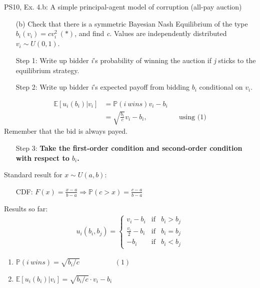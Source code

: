 \begin{frame}{PS10, Ex. 4.b: A simple principal-agent model of corruption (all-pay auction)}
    \begin{itemize}
      \item[(b)] Check that there is a symmetric Bayesian Nash Equilibrium of the type $b_i(v_i) = cv_i^2\ (*)$, and find \textit{c}. Values are independently distributed $v_i\sim U(0, 1)$.
    \end{itemize} \vspace{-8pt}
    \begin{multicols}{2}
      \begin{itemize}
        \item[Step 1:] Write up bidder \textit{i}'s probability of winning the auction if \textit{j} sticks to the equilibrium strategy.
        \item[Step 2:] Write up bidder \textit{i}'s expected payoff from bidding $b_i$ conditional on $v_i$.
      \end{itemize} \vspace{-8pt}
      \begin{align*}
        \mathbb{E}[u_i(b_i)|v_i]&=\mathbb{P}(i\ wins)v_i-b_i\\
                           &=\sqrt{\frac{b_i}{c}}v_i-b_i,&&\text{using (1)}
      \end{align*} \vspace{-8pt}
      Remember that the bid is always payed. \vspace{4pt}
      \begin{itemize}
        \item[Step 3:] \textbf{Take the first-order condition and second-order condition with respect to $b_i$.}
      \end{itemize}
      \vfill\null\columnbreak
      Standard result for $x\sim U(a, b):$ \vspace{-6pt}
      \begin{itemize}
        \item[CDF:] $F(x)=\frac{x-a}{b-a}\Rightarrow\mathbb{P}(c>x)=\frac{c-a}{b-a}$
      \end{itemize}
      \vspace{-6pt}
      Results so far: \vspace{-6pt}
      \begin{align*}
        u_i(b_i,b_j)=\left\{\begin{array}{lcl}
          v_i-b_i           & \text{if} & b_i>b_j \\
          \frac{v_i}{2}-b_i & \text{if} & b_i=b_j \\
          -b_i              & \text{if} & b_i<b_j
        \end{array}\right.
      \end{align*} \vspace{-16pt}
      \begin{enumerate}
        \item $\mathbb{P}(i\ wins)=\sqrt{b_i/c}\quad\quad\quad\quad\quad(1)$
        \item $\mathbb{E}[u_i(b_i)|v_i]=\sqrt{b_i/c}\cdot v_i-b_i$
      \end{enumerate}
      \vfill\null
    \end{multicols}
\end{frame}
